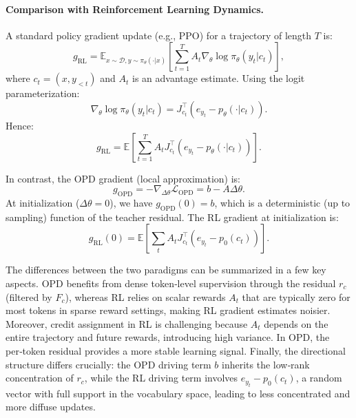 \documentclass{llmxive}
\begin{document}
\paragraph{Comparison with Reinforcement Learning Dynamics.}
A standard policy gradient update (e.g., PPO) for a trajectory of length \(T\) is:
\begin{equation}
g_{\mathrm{RL}} = \mathbb{E}_{x\sim\mathcal{D}, y\sim\pi_{\theta}(\cdot|x)}\left[ \sum_{t=1}^{T} A_t \nabla_\theta \log \pi_\theta(y_t|c_t) \right],
\end{equation}
where \(c_t = (x,y_{<t})\) and \(A_t\) is an advantage estimate. Using the logit parameterization:
\begin{equation}
\nabla_\theta \log \pi_\theta(y_t|c_t) = J_{c_t}^{\top} (e_{y_t} - p_\theta(\cdot|c_t)).
\end{equation}
Hence:
\begin{equation}
g_{\mathrm{RL}} = \mathbb{E}\left[ \sum_{t=1}^{T} A_t J_{c_t}^{\top} (e_{y_t} - p_\theta(\cdot|c_t)) \right].
\end{equation}

In contrast, the OPD gradient (local approximation) is:
\begin{equation}
g_{\mathrm{OPD}} = -\nabla_{\Delta\theta}\mathcal{L}_{\mathrm{OPD}} = b - A\Delta\theta.
\end{equation}
At initialization (\(\Delta\theta=0\)), we have \(g_{\mathrm{OPD}}(0) = b\), which is a deterministic (up to sampling) function of the teacher residual. The RL gradient at initialization is:
\begin{equation}
g_{\mathrm{RL}}(0) = \mathbb{E}\left[ \sum_{t} A_t J_{c_t}^{\top} (e_{y_t} - p_0(c_t)) \right].
\end{equation}

The differences between the two paradigms can be summarized in a few key aspects. OPD benefits from dense token‑level supervision through the residual \(r_c\) (filtered by \(F_c\)), whereas RL relies on scalar rewards \(A_t\) that are typically zero for most tokens in sparse reward settings, making RL gradient estimates noisier. Moreover, credit assignment in RL is challenging because \(A_t\) depends on the entire trajectory and future rewards, introducing high variance. In OPD, the per‑token residual provides a more stable learning signal. Finally, the directional structure differs crucially: the OPD driving term \(b\) inherits the low‑rank concentration of \(r_c\), while the RL driving term involves \(e_{y_t} - p_0(c_t)\), a random vector with full support in the vocabulary space, leading to less concentrated and more diffuse updates.
\end{document}
